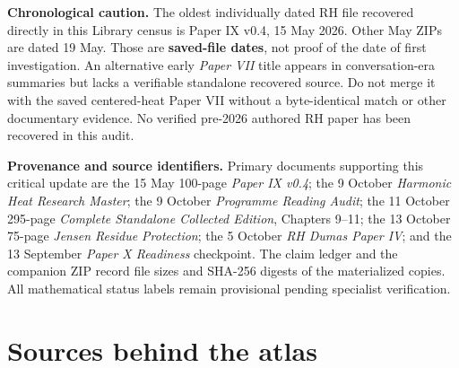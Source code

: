 \documentclass[
  10pt,
  a4paper,
  10pt,
  oneside,
  openany]{book}
\begin{document}
\textbf{Chronological caution.} The oldest individually dated RH file
recovered directly in this Library census is Paper IX v0.4, 15 May 2026.
Other May ZIPs are dated 19 May. Those are \textbf{saved-file dates},
not proof of the date of first investigation. An alternative early
\emph{Paper VII} title appears in conversation-era summaries but lacks a
verifiable standalone recovered source. Do not merge it with the saved
centered-heat Paper VII without a byte-identical match or other
documentary evidence. No verified pre-2026 authored RH paper has been
recovered in this audit.

\textbf{Provenance and source identifiers.} Primary documents supporting
this critical update are the 15 May 100-page \emph{Paper IX v0.4}; the 9
October \emph{Harmonic Heat Research Master}; the 9 October
\emph{Programme Reading Audit}; the 11 October 295-page \emph{Complete
Standalone Collected Edition}, Chapters 9--11; the 13 October 75-page
\emph{Jensen Residue Protection}; the 5 October \emph{RH Dumas Paper
IV}; and the 13 September \emph{Paper X Readiness} checkpoint. The claim
ledger and the companion ZIP record file sizes and SHA-256 digests of
the materialized copies. All mathematical status labels remain
provisional pending specialist verification.

\section{Sources behind the atlas}\label{atlas-sources}
\end{document}
